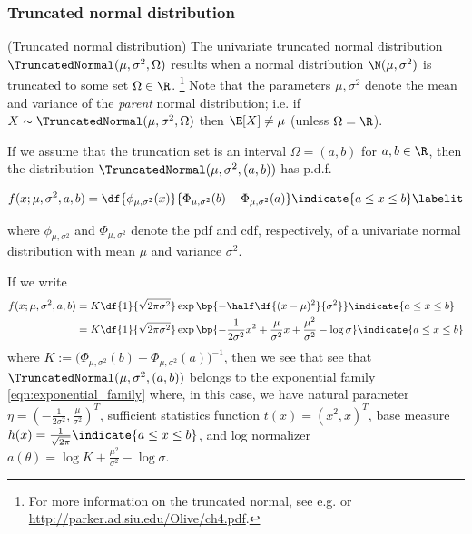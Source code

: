 \documentclass{article} %
\begin{document}
\subsubsection{Truncated normal distribution}

\begin{example}{(Truncated normal distribution)} 
\label{ex:truncated_normal_as_ef} The univariate truncated normal distribution $\TruncatedNormal(\mu,  \sigma^2,  \Omega)$ results when a normal distribution $\N(\mu,  \sigma^2)$ is truncated to some set $\Omega \in \R$. \footnote{For more information on the truncated normal,  see e.g.  \cite{burkardt2014truncated} or \url{http://parker.ad.siu.edu/Olive/ch4.pdf}.}   Note that the parameters $\mu, \sigma^2$ denote the mean and variance of the \textit{parent} normal distribution;  i.e.  if $X \sim \TruncatedNormal(\mu,  \sigma^2,  \Omega)$ then $\E[X] \neq \mu$ (unless $\Omega = \R$). 

If we assume that the truncation set is an interval $\Omega = (a,b)$ for $a,b \in \R$,  then the distribution $\TruncatedNormal(\mu,  \sigma^2,  (a,b))$ has p.d.f.

\begin{align*}
f(x ; \mu,  \sigma^2,  a,  b) = \df{\phi_{\mu, \sigma^2} (x) }{\Phi_{\mu, \sigma^2} (b)  - \Phi_{\mu, \sigma^2} (a) } \indicate{a \leq x \leq b} \labelit \label{eqn:pdf_of_normal_truncated_to_an_interval}
\end{align*} 

where $\phi_{\mu,  \sigma^2}$ and $\Phi_{\mu,  \sigma^2}$ denote the pdf and cdf,  respectively,  of a univariate normal distribution with mean $\mu$ and variance $\sigma^2$.   

If we write
\begin{align*}
f(x ; \mu,  \sigma^2,  a,  b) & = K \df{1}{\sqrt{2 \pi \sigma^2}} \exp \bp{-\half \df{(x-\mu)^2}{\sigma^2}}  \indicate{a \leq x \leq b} \\
& = K \df{1}{\sqrt{2 \pi \sigma^2}} \exp \bp{ - \frac{1}{2 \sigma^2} x^2 + \frac{\mu}{\sigma^2} x  + \frac{\mu^2}{\sigma^2}  - \log \sigma}  \indicate{a \leq x \leq b} 
\end{align*} 
where $K := \big( \Phi_{\mu, \sigma^2} (b)  - \Phi_{\mu, \sigma^2} (a) \big)^{-1}$,  then we see that see that  $\TruncatedNormal(\mu,  \sigma^2,  (a,b))$ belongs to the exponential family \eqref{eqn:exponential_family} where,  in this case,  we have natural parameter $\eta = (- \frac{1}{2 \sigma^2},  \frac{\mu}{\sigma^2})^T$,  sufficient statistics function $t(x) = (x^2,  x)^T$,  base measure $h(x) =  \frac{1}{\sqrt{2 \pi}}  \indicate{a \leq x \leq b}$,  and log normalizer $a(\theta) = \log K + \frac{\mu^2}{\sigma^2} - \log \sigma$.
 
\end{example}
\end{document}
